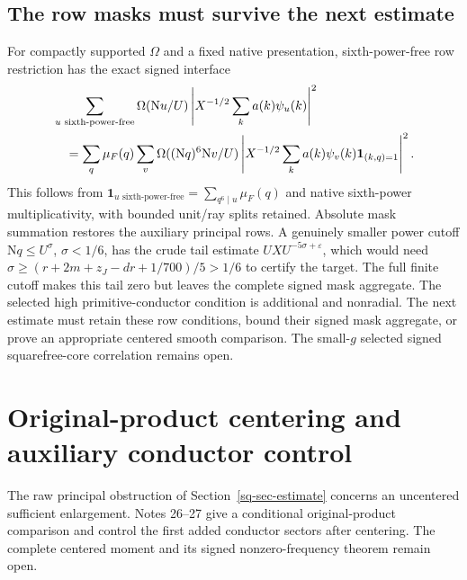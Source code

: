 \documentclass[11pt]{article}
\theoremstyle{definition}
\newcommand{\N}{\mathrm N}
\newcommand{\eps}{\varepsilon}
\newcommand{\Id}{\mathbf 1}
\begin{document}
\subsection{The row masks must survive the next estimate}
For compactly supported $\Omega$ and a fixed native presentation,
sixth-power-free row restriction has the exact signed interface
\begin{align}\label{sq-sixthfree-mask}
 &\sum_{u\text{ sixth-power-free}}\Omega(\N u/U)
 \left|X^{-1/2}\sum_k a(k)\psi_u(k)\right|^2\notag\\
 &\quad=\sum_q\mu_F(q)\sum_v\Omega((\N q)^6\N v/U)
 \left|X^{-1/2}\sum_k a(k)\psi_v(k)\Id_{(k,q)=1}\right|^2.
\end{align}
This follows from $\Id_{u\text{ sixth-power-free}}=
\sum_{q^6\mid u}\mu_F(q)$ and native sixth-power multiplicativity,
with bounded unit/ray splits retained. Absolute mask summation restores
the auxiliary principal rows. A genuinely smaller power cutoff
$\N q\le U^\sigma$, $\sigma<1/6$, has the crude tail estimate
$UXU^{-5\sigma+\eps}$, which would need
$\sigma\ge(r+2m+z_J-dr+1/700)/5>1/6$ to certify the target.
The full finite cutoff makes this tail zero but leaves the complete
signed mask aggregate. The selected high primitive-conductor condition
is additional and nonradial.
The next estimate must retain these row conditions, bound their signed
mask aggregate, or prove an appropriate centered smooth comparison.
The small-$g$ selected signed squarefree-core correlation remains open.

\section{Original-product centering and auxiliary conductor control}
\label{ctr-sec}
The raw principal obstruction of Section~\ref{sq-sec-estimate} concerns
an uncentered sufficient enlargement. Notes 26--27 \cite{n26,n27}
give a conditional original-product comparison and control the first
added conductor sectors after centering. The complete centered moment
and its signed nonzero-frequency theorem remain open.
\end{document}
